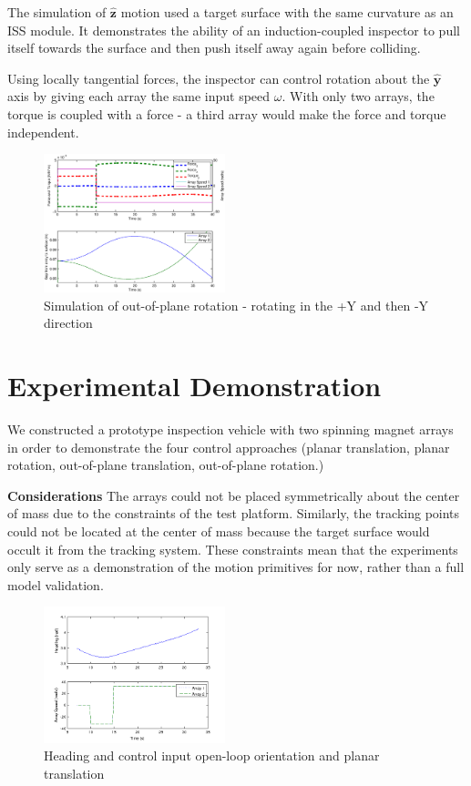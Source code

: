 \documentclass[letterpaper, 10 pt, conference]{ieeeconf}  %
\begin{document}
The simulation of $\hat{\textbf{z}}$ motion used a target surface with the same curvature as an ISS module. It demonstrates the ability of an induction-coupled inspector to pull itself towards the surface and then push itself away again before colliding. 


Using locally tangential forces, the inspector can control rotation about the $\hat{\textbf{y}}$ axis by giving each array the same input speed $\omega$. With only two arrays, the torque is coupled with a force - a third array would make the force and torque independent. 
   

   \begin{figure}[thpb]
      \centering
      \includegraphics[width = 0.47\textwidth]{figures/curve_rotations.eps}
      \caption{Simulation of out-of-plane rotation - rotating in the +Y and then -Y direction}
      \label{fig:ooprotation}
   \end{figure}


\section{Experimental Demonstration}\label{sec:experiments}
We constructed a prototype inspection vehicle with two spinning magnet arrays in order to demonstrate the four control approaches (planar translation, planar rotation, out-of-plane translation, out-of-plane rotation.) 

\textbf{Considerations} The arrays could not be placed symmetrically about the center of mass due to the constraints of the test platform. Similarly, the tracking points could not be located at the center of mass because the target surface would occult it from the tracking system. These constraints mean that the experiments only serve as a demonstration of the motion primitives for now, rather than a full model validation.

  \begin{figure}[thpb]
      \centering
      \includegraphics[width = 0.47\textwidth]{figures/driving_forward.tif}
      \caption{Heading and control input open-loop orientation and planar translation}
      \label{fig:planartranslationcontrol}
   \end{figure}
   
\end{document}
